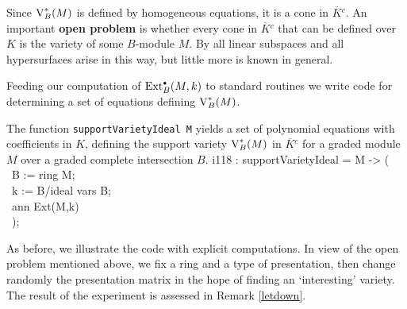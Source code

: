 Since $\operatorname{V}^*_B(M)$ is defined by homogeneous equations, it is a cone
in ${\overline K}{}^c$.  An important {\bf open problem} is whether
every cone in ${\overline K}{}^c$ that can be defined over $K$ is the
variety of some $B$-module $M$.  By \cite[Sect.~6]{CI:MR90g:13027} all
linear subspaces and all hypersurfaces arise in this way, but little
more is known in general.

Feeding our computation of $\operatorname{Ext}^{\scriptscriptstyle\bullet}_B(M,k)$ to standard \Mtwo routines
we write code for determining a set of equations defining $\operatorname{V}^*_B(M)$.

\begin{sCode}
The function {\tt supportVarietyIdeal M} yields a set of polynomial
equations with coefficients in $K$, defining the support variety
$\operatorname{V}^*_B(M)$ in ${\overline K}{}^c$ for a graded module $M$ over a
graded complete intersection $B$.
\beginOutput
i118 : supportVarietyIdeal = M -> (\\
\          B := ring M;\\
\          k := B/ideal vars B;\\
\          ann Ext(M,k)\\
\          );\\
\endOutput
 \end{sCode}

As before, we illustrate the code with explicit computations.  In
view of the open problem mentioned above, we fix a ring and a type of
presentation, then change randomly the presentation matrix in the hope
of finding an `interesting' variety.  The result of the experiment
is assessed in Remark \ref{letdown}.

